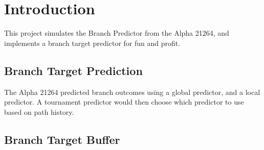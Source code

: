 \section{Introduction}
This project simulates the Branch Predictor from the Alpha 21264, and implements a branch target predictor for fun and profit.

\subsection{Branch Target Prediction}
The Alpha 21264 predicted branch outcomes using a global predictor, and a local predictor. A tournament predictor would then choose which predictor to use based on path history.

\subsection{Branch Target Buffer}
